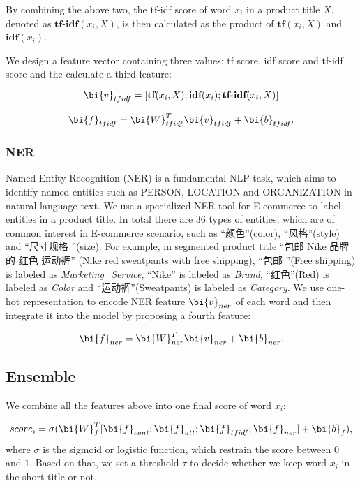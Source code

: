 By combining the above two, the tf-idf score of word $x_i$ in a product title $X$, denoted as $\textbf{tf-idf}(x_i, X)$, is then calculated as the product of $\textbf{tf}(x_i, X)$ and $\textbf{idf}(x_i)$.

We design a feature vector containing three values: tf score, idf score and tf-idf score and the calculate a third feature:

\begin{equation}
\label{eqn:tf-idf}
\bi{v}_{tfidf} = [\textbf{tf}(x_i, X); \textbf{idf}(x_i); \textbf{tf-idf}(x_i, X)]
\end{equation}

\begin{equation}
\bi{f}_{tfidf} =\bi{W}_{tfidf}^T \bi{v}_{tfidf} + \bi{b}_{tfidf}.
\end{equation}


\subsubsection{NER}   

Named Entity Recognition (NER) is a fundamental NLP task, which aims to identify
named entities such as PERSON, LOCATION and ORGANIZATION in natural language text.
We use a specialized NER tool for E-commerce to label entities in 
a product title. In total there are $36$ types of entities, which are of 
common interest in E-commerce scenario, such as ``颜色''(color), 
``风格''(style) and ``尺寸规格 ''(size).
For example, in segmented product title ``包邮 Nike 品牌 的 红色 运动裤'' 
(Nike red sweatpants with free shipping),
``包邮 ''(Free shipping) is labeled as \emph{Marketing\_Service},
``Nike'' is labeled as \emph{Brand}, ``红色''(Red) is labeled as \emph{Color}
and ``运动裤''(Sweatpants) is labeled as \emph{Category}.
We use one-hot representation to encode NER feature $\bi{v}_{ner}$ of each word and 
then integrate it into the model by proposing a fourth feature:

\begin{equation}
\label{eqn:ner}
\bi{f}_{ner} = \bi{W}_{ner}^T \bi{v}_{ner} + \bi{b}_{ner}.
\end{equation}

\subsection{Ensemble}
\label{sec:inference}
We combine all the features above into one final score of word $x_i$:

\begin{equation}
\label{eqn:ner}
score_i = \sigma(\bi{W}_{f}^T [\bi{f}_{cont};\bi{f}_{att};\bi{f}_{tfidf};\bi{f}_{ner}] + \bi{b}_{f}),
\end{equation}
where $\sigma$ is the sigmoid or logistic function, which restrain the score between $0$ and $1$. Based on that, we set a threshold $\tau$ to decide whether we keep word $x_i$ in the short title or not.

